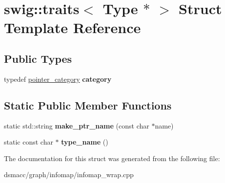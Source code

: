 \hypertarget{structswig_1_1traits_3_01Type_01_5_01_4}{}\section{swig\+:\+:traits$<$ Type $\ast$ $>$ Struct Template Reference}
\label{structswig_1_1traits_3_01Type_01_5_01_4}
\subsection*{Public Types}
\begin{DoxyCompactItemize}
\item 
\mbox{\label{structswig_1_1traits_3_01Type_01_5_01_4_a500d091f0454ce9f328c030b191ac18f}} 
typedef \mbox{\hyperlink{structswig_1_1pointer__category}{pointer\+\_\+category}} {\bfseries category}
\end{DoxyCompactItemize}
\subsection*{Static Public Member Functions}
\begin{DoxyCompactItemize}
\item 
\mbox{\label{structswig_1_1traits_3_01Type_01_5_01_4_a5251b3fb5f48a5a48f17c25cafe21817}} 
static std\+::string {\bfseries make\+\_\+ptr\+\_\+name} (const char $\ast$name)
\item 
\mbox{\label{structswig_1_1traits_3_01Type_01_5_01_4_ac5aae8203a9a4b151f6719e58a0cc252}} 
static const char $\ast$ {\bfseries type\+\_\+name} ()
\end{DoxyCompactItemize}


The documentation for this struct was generated from the following file\+:\begin{DoxyCompactItemize}
\item 
dsmacc/graph/infomap/infomap\+\_\+wrap.\+cpp\end{DoxyCompactItemize}
